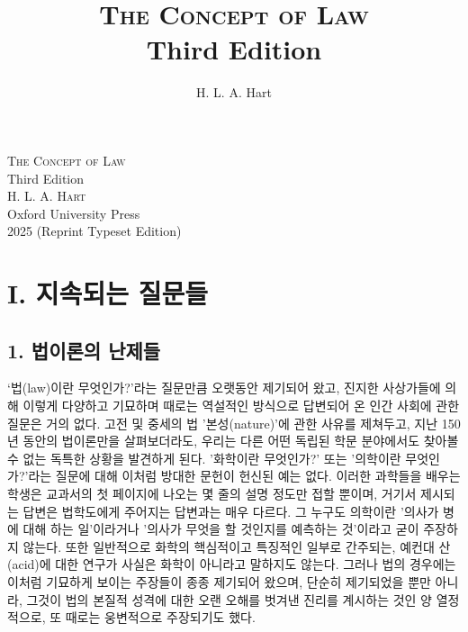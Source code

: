 \documentclass[12pt, oneside]{book}  %
\title{\Huge\textsc{The Concept of Law} \\[2ex] \Large Third Edition}
\author{\Large H. L. A. Hart}
\date{}
\begin{document}
\begin{titlepage}
  \centering
  \vspace*{3cm}
  {\Huge\textsc{The Concept of Law}}\\[1.5ex]
  {\Large Third Edition}\\[4ex]
  \textsc{H. L. A. Hart}\\[6ex]
  {\small Oxford University Press\\
  2025 (Reprint Typeset Edition)}
  \vfill
\end{titlepage}

\section{\texorpdfstring{\textbf{I. 지속되는
질문들}}{I. 지속되는 질문들}}\label{i.-uxc9c0uxc18duxb418uxb294-uxc9c8uxbb38uxb4e4}

\subsection{\texorpdfstring{\textbf{1. 법이론의
난제들}}{1. 법이론의 난제들}}\label{uxbc95uxc774uxb860uxc758-uxb09cuxc81cuxb4e4}

`법(law)이란 무엇인가?'라는 질문만큼 오랫동안 제기되어 왔고, 진지한
사상가들에 의해 이렇게 다양하고 기묘하며 때로는 역설적인 방식으로
답변되어 온 인간 사회에 관한 질문은 거의 없다. 고전 및 중세의 법
'본성(nature)'에 관한 사유를 제쳐두고, 지난 150년 동안의 법이론만을
살펴보더라도, 우리는 다른 어떤 독립된 학문 분야에서도 찾아볼 수 없는
독특한 상황을 발견하게 된다. '화학이란 무엇인가?' 또는 '의학이란
무엇인가?'라는 질문에 대해 이처럼 방대한 문헌이 헌신된 예는 없다. 이러한
과학들을 배우는 학생은 교과서의 첫 페이지에 나오는 몇 줄의 설명 정도만
접할 뿐이며, 거기서 제시되는 답변은 법학도에게 주어지는 답변과는 매우
다르다. 그 누구도 의학이란 '의사가 병에 대해 하는 일'이라거나 '의사가
무엇을 할 것인지를 예측하는 것'이라고 굳이 주장하지 않는다. 또한
일반적으로 화학의 핵심적이고 특징적인 일부로 간주되는, 예컨대 산(acid)에
대한 연구가 사실은 화학이 아니라고 말하지도 않는다. 그러나 법의 경우에는
이처럼 기묘하게 보이는 주장들이 종종 제기되어 왔으며, 단순히 제기되었을
뿐만 아니라, 그것이 법의 본질적 성격에 대한 오랜 오해를 벗겨낸 진리를
계시하는 것인 양 열정적으로, 또 때로는 웅변적으로 주장되기도 했다.
\end{document}
